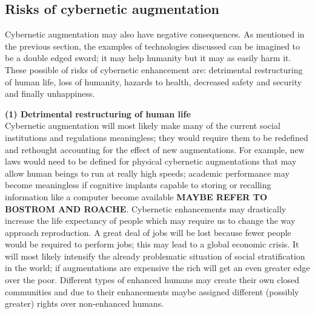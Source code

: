 \subsection{Risks of cybernetic augmentation}


Cybernetic augmentation may also have negative consequences. As mentioned in the previous section, the examples of technologies discussed can be imagined to be a double edged sword; it may help humanity but it may as easily harm it. These possible of risks of cybernetic enhancement are: detrimental restructuring of human life, loss of humanity, hazards to health, decreased safety and security and finally unhappiness.

\textbf{(1) Detrimental restructuring of human life} \\
Cybernetic augmentation will most likely make many of the current social institutions and regulations meaningless; they would require them to be redefined and rethought accounting for the effect of new augmentations. For example, new laws would need to be defined for physical cybernetic augmentations that may allow human beings to run at really high speeds; academic performance may become meaningless if cognitive implants capable to storing or recalling information like a computer become available {\bf MAYBE REFER TO BOSTROM AND ROACHE}. Cybernetic enhancements may drastically increase the life expectancy of people which may require us to change the way approach reproduction. A great deal of jobs will be lost because fewer people would be required to perform jobs; this may lead to a global economic crisis. It will most likely intensify the already problematic situation of social stratification in the world; if augmentations are expensive the rich will get an even greater edge over the poor. Different types of enhanced humans may create their own closed communities and due to their enhancements maybe assigned different (possibly greater) rights over non-enhanced humans.


